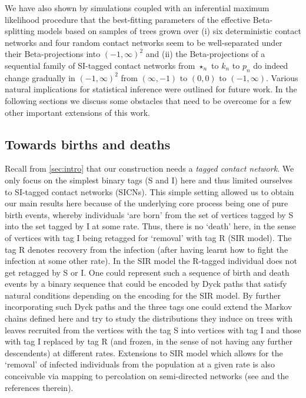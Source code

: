 \documentclass[review]{elsarticle}
\numberwithin{equation}{section}
\let\orgautoref\autoref
\renewcommand{\autoref}
        {\def\equationautorefname{Eq.}%
         \def\figureautorefname{Fig.}%
         \def\subfigureautorefname{Fig.}%
         \def\sectionautorefname{Sect.}%
         \def\subsectionautorefname{Sect.}%
         \def\subsubsectionautorefname{Sect.}%
         \def\Itemautorefname{item}%
         \def\tableautorefname{Table}%
         \def\propositionautorefname{Prop.}%
         \def\corollaryautorefname{Corollary}%
         \def\theoremautorefname{Theorem}%
         \def\remarkautorefname{Remark}%
         \def\lemmaautorefname{Lemma}%
         \def\proofofautorefname{Proof}%
         \def\exampleautorefname{Example}%
         \orgautoref}
\begin{document}
We have also shown by simulations coupled with an inferential maximum likelihood procedure that the best-fitting parameters of the effective Beta-splitting models based on samples of trees grown over (i) six deterministic contact networks and four random contact networks seem to be well-separated under their Beta-projections into $(-1,\infty)^2$ and (ii) the Beta-projections of a sequential family of SI-tagged contact networks from $\star_n$ to $k_n$ to $p_n$ do indeed change gradually in $(-1,\infty)^2$ from $(\infty,-1)$ to $(0,0)$ to $(-1,\infty)$.  
Various natural implications for statistical inference were outlined for future work.  
In the following sections we discuss some obstacles that need to be overcome for a few other important extensions of this work.

\subsection{Towards births and deaths}\label{S:D_TowardsBirthsAndDeaths}

Recall from \autoref{sec:intro} that our construction needs a {\em tagged contact network}.  
We only focus on the simplest binary tags (S and I) here and thus limited ourselves to SI-tagged contact networks (SICNs).  
This simple setting allowed us to obtain our main results here because of the underlying core process being one of pure birth events, whereby individuals `are born' from the set of vertices tagged by S into the set tagged by I at some rate.  
Thus, there is no `death' here, in the sense of vertices with tag I being retagged for `removal' with tag R (SIR model).  
The tag R denotes recovery from the infection (after having learnt how to fight the infection at some other rate).  
In the SIR model the R-tagged individual does not get retagged by S or I.    
One could represent such a sequence of birth and death events by a binary sequence that could be encoded by Dyck paths that satisfy natural conditions depending on the encoding for the SIR model.  
By further incorporating such Dyck paths and the three tags one could extend the Markov chains defined here and try to study the distributions they induce on trees with leaves recruited from the vertices with the tag S into vertices with tag I and those with tag I replaced by tag R (and frozen, in the sense of not having any further descendents) at different rates.  
Extensions to SIR model which allows for the `removal' of infected individuals from the population at a given rate is also conceivable via mapping to percolation on semi-directed networks (see \cite[V.B.4]{pastor2015} and the references therein).  
\end{document}
